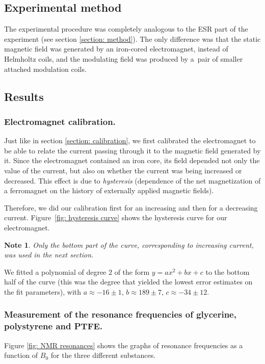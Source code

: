 \documentclass[a4paper]{jpconf}
\numberwithin{equation}{section}
\newtheorem*{note}{Note}
\begin{document}
\subsection{Experimental method}
The experimental procedure was completely analogous to the ESR part of the experiment (see section \ref{section: method}). The only difference was that the static magnetic field was generated by an iron-cored electromagnet, instead of Helmholtz coils, and the modulating field was produced by a~pair of smaller attached modulation coils.


\subsection{Results}
\subsubsection{Electromagnet calibration.}
Just like in section \ref{section: calibration}, we first calibrated the electromagnet to be able to relate the current passing through it to the magnetic field generated by it. Since the electromagnet contained an iron core, its field depended not only the value of the current, but also on whether the current was being increased or decreased. This effect is due to \emph{hysteresis} (dependence of the net magnetization of a ferromagnet on the history of externally applied magnetic fields). 

Therefore, we did our calibration first for an increasing and then for a decreasing current. Figure~\ref{fig: hysteresis curve} shows the hysteresis curve for our electromagnet.
\begin{note}
	Only the bottom part of the curve, corresponding to increasing current, was used in the next section.
\end{note}
We fitted a polynomial of degree $2$ of the form $y = ax^2 + bx + c$ to the bottom half of the curve (this was the degree that yielded the lowest error estimates on the fit parameters), with $a \approx -16 \pm 1$, $b \approx 189 \pm 7$, $c \approx -34 \pm 12.$

\subsubsection{Measurement of the resonance frequencies of glycerine, polystyrene and PTFE.}

Figure \ref{fig: NMR resonances} shows the graphs of resonance frequencies as a function of $B_0$ for the three different substances.
\end{document}
